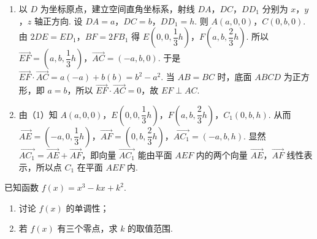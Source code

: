 \begin{solution}
\begin{enumerate}
    \item 以 \(D\) 为坐标原点，建立空间直角坐标系，射线 \(DA\)，\(DC\)，\(DD_1\) 分别为 \(x\)，\(y\)，\(z\) 轴正方向. 设 \(DA=a\)，\(DC=b\)，\(DD_1=h\). 则 \(A(a,0,0)\)，\(C(0,b,0)\). 由 \(2DE=ED_1\)，\(BF=2FB_1\) 得 \(E\left(0,0,\dfrac13h\right)\)，\(F\left(a,b,\dfrac23h\right)\). 所以 \(\overrightarrow{EF}=\left(a,b,\dfrac13h\right)\)，\(\overrightarrow{AC}=(-a,b,0)\). 于是 \(\overrightarrow{EF}\cdot\overrightarrow{AC}=a(-a)+b(b)=b^2-a^2\). 当 \(AB=BC\) 时，底面 \(ABCD\) 为正方形，即 \(a=b\)，所以 \(\overrightarrow{EF}\cdot\overrightarrow{AC}=0\)，故 \(EF\perp AC\).
    \item 由（1）知 \(A(a,0,0)\)，\(E\left(0,0,\dfrac13h\right)\)，\(F\left(a,b,\dfrac23h\right)\)，\(C_1(0,b,h)\). 从而 \(\overrightarrow{AE}=\left(-a,0,\dfrac13h\right)\)，\(\overrightarrow{AF}=\left(0,b,\dfrac23h\right)\)，\(\overrightarrow{AC_1}=(-a,b,h)\). 显然 \(\overrightarrow{AC_1}=\overrightarrow{AE}+\overrightarrow{AF}\)，即向量 \(\overrightarrow{AC_1}\) 能由平面 \(AEF\) 内的两个向量 \(\overrightarrow{AE}\)，\(\overrightarrow{AF}\) 线性表示，所以点 \(C_1\) 在平面 \(AEF\) 内.
\end{enumerate}
\end{solution}

\begin{problem}
已知函数 \(f(x)=x^3-kx+k^2\).

\begin{enumerate}
    \item 讨论 \(f(x)\) 的单调性；
    \item 若 \(f(x)\) 有三个零点，求 \(k\) 的取值范围.
\end{enumerate}
\end{problem}

